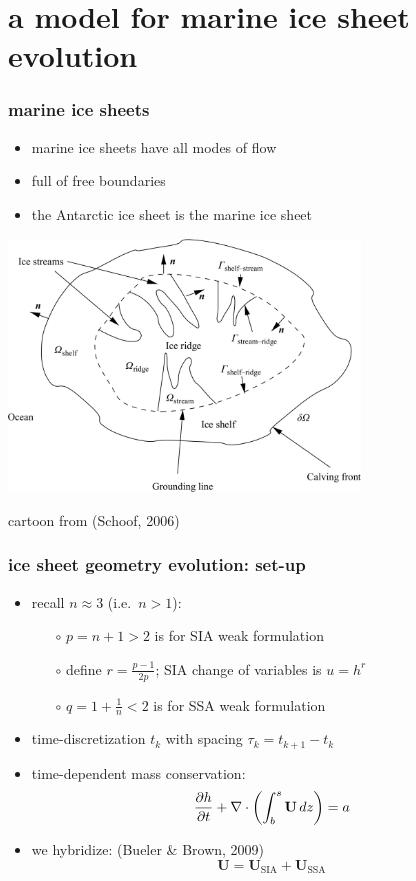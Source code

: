 \documentclass{beamer}
\newcommand{\Div}{\nabla\cdot}
\begin{document}
\section[marine ice sheets]{a model for marine ice sheet evolution}

\begin{frame}
  \frametitle{marine ice sheets}

\begin{itemize}
\item marine ice sheets have all modes of flow
\item full of free boundaries
\item the Antarctic ice sheet is the marine ice sheet
\end{itemize}

\begin{center}
\includegraphics[width=0.7\textwidth]{schoof-planform}

\tiny cartoon from (Schoof, 2006)
\end{center}
\end{frame}


\begin{frame}
  \frametitle{ice sheet geometry evolution: set-up}

\begin{itemize}
\item recall $n\approx 3$ (i.e.~$n>1$):
  \begin{itemize}
  \item[$\circ$] $p = n+1 > 2$ \quad  is for SIA weak formulation
  \item[$\circ$] define $r = \frac{p-1}{2p}$; \quad SIA change of variables is $u=h^r$
  \item[$\circ$] $q = 1 + \frac{1}{n} < 2$ \quad  is for SSA weak formulation
  \end{itemize}
\item time-discretization $t_k$ with spacing $\tau_k = t_{k+1}-t_k$

\bigskip
\item time-dependent mass conservation: 
  $$\frac{\partial h}{\partial t} + \Div \left(  \int_b^s {\bf U}\, dz \right)  =  a$$
\item we hybridize: \hfill \scriptsize (Bueler \& Brown, 2009) \normalsize
  $$\mathbf{U} = \mathbf{U}_{\text{SIA}} + \mathbf{U}_{\text{SSA}}$$
\end{itemize}
\end{frame}
\end{document}
